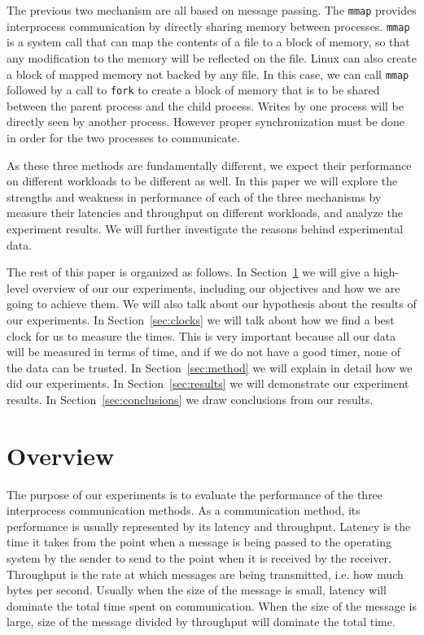 \documentclass{article}
\begin{document}
The previous two mechanism are all based on message passing.
The \texttt{mmap} provides interprocess communication by directly sharing memory between processes.
\texttt{mmap} is a system call that can map the contents of a file to a block of memory, so that any modification to the memory will be reflected on the file.
Linux can also create a block of mapped memory not backed by any file.
In this case, we can call \texttt{mmap} followed by a call to \texttt{fork} to create a block of memory that is to be shared between the parent process and the child process.
Writes by one process will be directly seen by another process.
However proper synchronization must be done in order for the two processes to communicate.

As these three methods are fundamentally different, we expect their performance on different workloads to be different as well.
In this paper we will explore the strengths and weakness in performance of each of the three mechanisms by measure their latencies and throughput on different workloads, and analyze the experiment results.
We will further investigate the reasons behind experimental data.

The rest of this paper is organized as follows.
In Section~\ref{sec:overview} we will give a high-level overview of our our experiments, including our objectives and how we are going to achieve them.
We will also talk about our hypothesis about the results of our experiments.
In Section~\ref{sec:clocks} we will talk about how we find a best clock for us to measure the times.
This is very important because all our data will be measured in terms of time, and if we do not have a good timer, none of the data can be trusted.
In Section~\ref{sec:method} we will explain in detail how we did our experiments.
In Section~\ref{sec:results} we will demonstrate our experiment results.
In Section~\ref{sec:conclusions} we draw conclusions from our results.

\section{Overview}
\label{sec:overview}
The purpose of our experiments is to evaluate the performance of the three interprocess communication methods.
As a communication method, its performance is usually represented by its latency and throughput.
Latency is the time it takes from the point when a message is being passed to the operating system by the sender to send to the point when it is received by the receiver.
Throughput is the rate at which messages are being transmitted, i.e. how much bytes per second.
Usually when the size of the message is small, latency will dominate the total time spent on communication.
When the size of the message is large, size of the message divided by throughput will dominate the total time.
\end{document}
